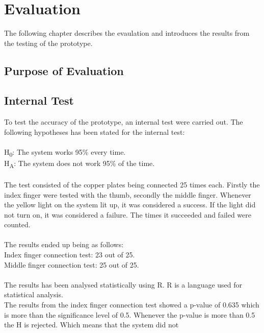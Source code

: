 \chapter{Evaluation}

The following chapter describes the evaulation and introduces the results from the testing of the prototype. 

\section{Purpose of Evaluation}



\section{Internal Test}

To test the accuracy of the prototype, an internal test were carried out. The following hypotheses has been stated for the internal test: \\\\
H\textsubscript{0}: The system works 95\% every time.\\
H\textsubscript{A}: The system does not work 95\% of the time.\\\\

The test consisted of the copper plates being connected 25 times each. Firstly the index finger were tested with the thumb, secondly the middle finger. Whenever the yellow light on the system
lit up, it was considered a success. If the light did not turn on, it was considered a failure. The times it succeeded and failed were counted.\\\\

The results ended up being as follows:\\
Index finger connection test: 23 out of 25. \\
Middle finger connection test: 25 out of 25.\\\\

The results has been analysed statistically using R\citep{R}. R is a language used for statistical analysis.\\
The results from the index finger connection test showed a p-value of 0.635 which is more than the significance level of 0.5. 
Whenever the p-value is more than 0.5 the H is rejected. Which means that the system did not 

